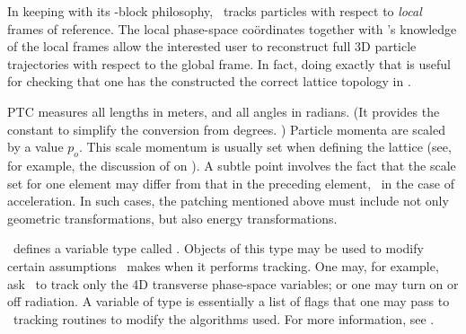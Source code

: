 In keeping with its \LEGO-block philosophy, \PTC\ tracks particles
with respect to \emph{local} frames of reference. The local phase-space
co\"ordinates together with \PTC's knowledge of the local frames
allow the interested user to reconstruct full 3D particle
trajectories with respect to the global frame. In fact, doing exactly
that is useful for checking that one has the constructed the correct
lattice topology in \PTC.

 PTC measures all lengths in meters, and all
angles in radians. (It provides the constant  to simplify
the conversion from degrees.%
)
Particle momenta are scaled by a value $p_o$. This scale momentum
is usually set when defining the lattice (see, for example,
the discussion of  on
). A subtle point involves the fact that the scale
set for one element may differ from that in the preceding element,
\eg\ in the case of acceleration.
In such cases, the patching mentioned above must include not only
geometric transformations, but also energy transformations.

 \PTC\ defines a variable
type called .
Objects of this type may be used to modify certain assumptions
\PTC\ makes when it performs tracking. One may, for example,
ask \PTC\ to track only the 4D transverse phase-space variables;
or one may turn on or off radiation. A variable of type
is essentially a list of flags that one may pass to \PTC\ tracking
routines to modify the algorithms used. For more information, see
.

